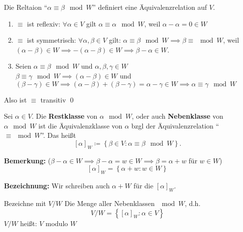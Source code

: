 \begin{sublemma}
	Die Reltaion ``$ \alpha \equiv \beta \mod W $'' definiert eine Äquivalenzrelation auf $ V $.
\end{sublemma}

\begin{subproof*}
	\begin{enumerate}[label=(\arabic*)]
		\item $ \equiv $ ist reflexiv: $ \forall \alpha \in V $ gilt $ \alpha \equiv \alpha \mod W $, weil $ \alpha - \alpha = 0 \in W $ 
		\item $ \equiv $ ist symmetrisch: $ \forall \alpha, \beta \in V $ gilt: $ \alpha \equiv \beta \mod W \implies  \beta \equiv \mod W $, weil $ (\alpha - \beta) \in W \implies -(\alpha - \beta) \in W \implies \beta - \alpha \in W $.
		\item Seien $ \alpha \equiv \beta \mod W $ und $ \alpha, \beta, \gamma \in W $\\
			$ \beta \equiv \gamma \mod W \implies  (\alpha - \beta) \in W $ und $ (\beta - \gamma) \in W \implies (\alpha - \beta) + (\beta - \gamma) = \alpha - \gamma \in W \implies  \alpha \equiv \gamma \mod W $ 
	\end{enumerate}
	Also ist $ \equiv $ transitiv \qed
\end{subproof*}

\begin{subdefinition}
	Sei $ \alpha \in V $. Die \textbf{Restklasse} von $ \alpha \mod W $, oder auch \textbf{Nebenklasse} von $ \alpha \mod W $ ist die Äquivalenzklasse von $ \alpha $ bzgl der Äquivalenzrelation ``$ \equiv \mod W $''. Das heißt
	\[
		[\alpha]_W \coloneqq \left\{ \beta \in V : \alpha \equiv \beta \mod W \right\} .
	\]
	
\end{subdefinition}

\textbf{Bemerkung:} ($ \beta - \alpha \in W \implies \beta - \alpha = w \in W \implies \beta = \alpha + w $ für $ w \in W $)
\[
	[\alpha]_W = \left\{ \alpha + w : w \in W \right\} 
\]

\textbf{Bezeichnung:} Wir schreiben auch $ \alpha + W $ für die $ [\alpha]_W $. 

\begin{subdefinition}
	Bezeichne mit $ V / W $ Die Menge aller Nebenklassen $ \mod W $, d.h.
	\[
		V / W = \left\{ [\alpha]_W : \alpha \in V \right\} 
	\]
	$ V / W $ heißt: $ V $ modulo $ W $ 
\end{subdefinition}

